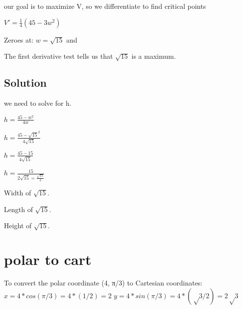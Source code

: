 \documentclass[12pt,a4paper]{article}
\begin{document}
\noindent our goal is to maximize V, so we differentiate to find critical points

\noindent $V' = \frac{1}{4} (45 - 3w^2)$

\noindent Zeroes at: $w = \sqrt{15}$ and 

\noindent The first derivative test tells us that $\sqrt{15}$ is a maximum.

\subsection*{Solution}

we need to solve for h.

$h = \frac{45 - w^2}{4w}$

$h = \frac{45-\sqrt{15}^2}{4\sqrt{15}}$

$h = \frac{45 - 15}{4\sqrt{15}}$

$h = \frac{15}{2\sqrt{15} = \frac{\sqrt{15}}{2}}$

Width of $\sqrt{15}$.

Length of $\sqrt{15}$.

Height of $\sqrt{15}$.

\newpage

\section*{polar to cart}
To convert the polar coordinate (4, π/3) to Cartesian coordinates: 
$x = 4 * cos(π/3) = 4 * (1/2) = 2$
$y = 4 * sin(π/3) = 4 * (√3/2) = 2√3$
\end{document}
